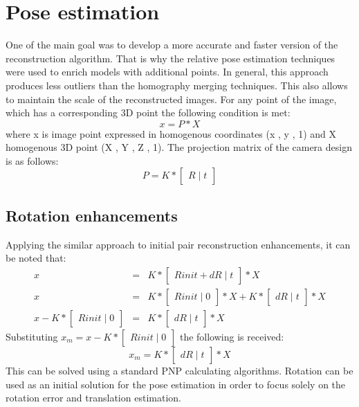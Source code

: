 \section{Pose estimation}
One of the main goal was to develop a more accurate and faster version of the reconstruction algorithm. That is why the relative pose estimation techniques were used to enrich models with additional points. In general, this approach produces less outliers than the homography merging techniques. This also allows to maintain the scale of the reconstructed images. For any point of the image, which has a corresponding 3D point the following condition is met:
\begin{equation} \label{eq:projectionEquation}
 x = P * X
\end{equation}
where x is image point expressed in homogenous coordinates (x , y , 1) and X homogenous 3D point (X , Y , Z , 1). 
The projection matrix of the camera design is as follows: 
\begin{equation} \label{eq:projectionEquation}
 P = K * \begin{bmatrix}R\mid t\end{bmatrix}
\end{equation}
\subsection{Rotation enhancements}
Applying the similar approach to initial pair reconstruction enhancements, it can be noted that:
\begin{equation} \label{eq:projectionRotError1}
\begin{array}{rcl}
 x & = & K * \begin{bmatrix}Rinit + dR\mid t\end{bmatrix} * X \\
 x & = & K * \begin{bmatrix}Rinit\mid 0\end{bmatrix} * X + K * \begin{bmatrix}dR\mid t\end{bmatrix} * X \\
 x - K * \begin{bmatrix}Rinit\mid 0\end{bmatrix} & = & K * \begin{bmatrix}dR\mid t\end{bmatrix} * X
\end{array}
\end{equation}
Substituting $x_{m} = x - K * \begin{bmatrix}Rinit\mid 0\end{bmatrix}$ the following is received: 
\begin{equation} \label{eq:projectionRotError2}
x_{m} = K * \begin{bmatrix}dR\mid t\end{bmatrix} * X
\end{equation}
This can be solved using a standard PNP calculating algorithms. Rotation can be used as an initial solution for the pose estimation in order to focus solely on the rotation error and translation estimation.
